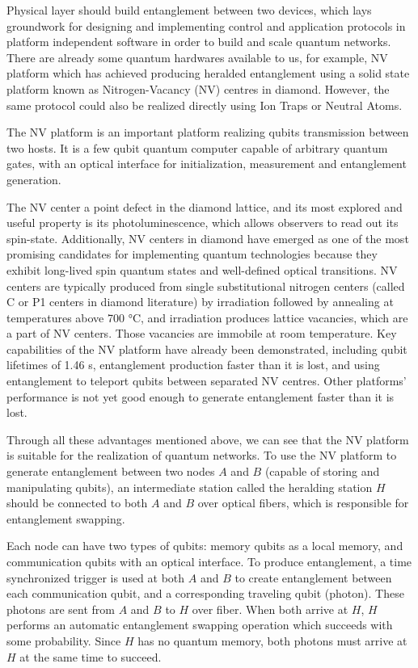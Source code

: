 \documentclass[10pt]{article}
\begin{document}
Physical layer should build entanglement between two devices, which lays groundwork for designing and implementing control and application protocols in platform independent software in order to build and scale quantum networks. There are already some quantum hardwares available to us, for example, NV platform which has achieved producing heralded entanglement using a solid state platform known as Nitrogen-Vacancy (NV) centres in diamond\cite{hensen2015loophole}. 
However, the same protocol could also be realized directly using Ion Traps\cite{moehring2007entanglement}
or Neutral Atoms\cite{hofmann2012heralded}.

The NV platform is an important platform realizing qubits transmission between two hosts. It is a few qubit quantum computer capable of arbitrary quantum gates, with an optical interface for initialization, measurement and entanglement generation. 

The NV center a point defect in the diamond lattice, and its most explored and useful property is its photoluminescence, which allows observers to read out its spin-state.
Additionally, NV centers in diamond have emerged as one of the most promising candidates for implementing quantum technologies because they exhibit long-lived spin quantum states and well-defined optical transitions\cite{childress2013diamond}. NV centers are typically produced from single substitutional nitrogen centers (called C or P1 centers in diamond literature) by irradiation followed by annealing at temperatures above 700 °C, and irradiation produces lattice vacancies, which are a part of NV centers. Those vacancies are immobile at room temperature. Key capabilities of the NV platform have already been demonstrated, including qubit lifetimes of 1.46 s, entanglement production faster than it is lost, and using entanglement to teleport qubits between separated NV centres. Other platforms' performance is not yet good enough to generate entanglement faster than it is lost.

Through all these advantages mentioned above, we can see that the NV platform is suitable for the realization of quantum networks. To use the NV platform to generate entanglement between two nodes $A$ and $B$ (capable of storing and manipulating qubits), an intermediate station called the heralding station $H$ should be connected to both $A$ and $B$ over optical fibers, which is responsible for entanglement swapping.

Each node can have two types of qubits: memory qubits as a local memory, and communication qubits with an optical interface. To produce entanglement, a time synchronized trigger is used at both $A$ and $B$ to create entanglement between each communication qubit, and a corresponding traveling qubit (photon). These photons are sent from $A$ and $B$ to $H$ over fiber. When both arrive at $H$, $H$ performs an automatic entanglement swapping operation which succeeds with some probability. Since $H$ has no quantum memory, both photons must arrive at $H$ at the same time to succeed.
\end{document}
